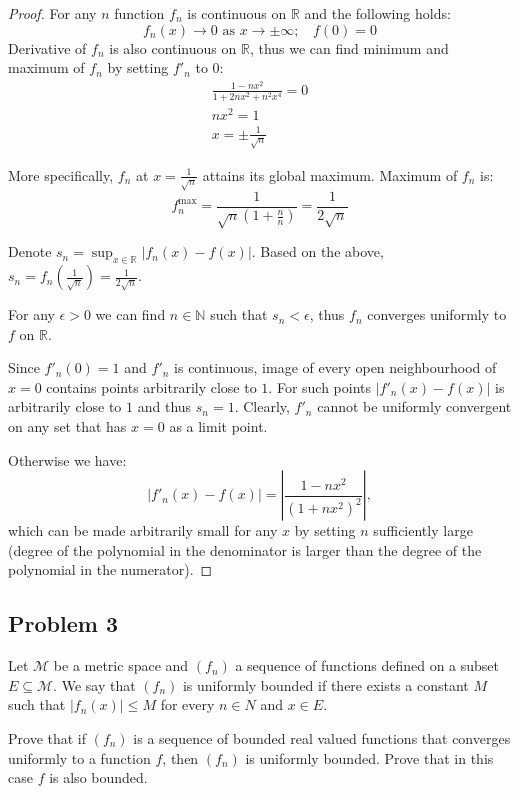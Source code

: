 \documentclass{article}
\begin{document}
\begin{proof}

For any $n$ function $f_n$ is continuous  on $\mathbb{R}$ and the following holds:
\[ f_n(x) \to 0 \text{ as } x \to \pm \infty; \>\>\>\> f(0) = 0 \]
Derivative of $f_n$ is also continuous on $\mathbb{R}$, thus we can find minimum and maximum of $f_n$ by setting $f'_n$ to $0$:
\begin{gather*}
    \frac{1-nx^2}{1+2nx^2+n^2x^4} = 0 \\
    nx^2 = 1 \\
    x = \pm \frac{1}{\sqrt{n}}
\end{gather*}

More specifically, $f_n$ at $x=\frac{1}{\sqrt{n}}$ attains its global maximum.
Maximum of $f_n$ is:
\[ f^{\text{max}}_n = \frac{1}{\sqrt{n}(1+\frac{n}{n})} = \frac{1}{2\sqrt{n}} \]

Denote $s_n = \sup_{x\in\mathbb{R}} |f_n(x)-f(x)|$.
Based on the above, $s_n = f_n \left( \frac{1}{\sqrt{n}} \right) = \frac{1}{2\sqrt{n}}$.

For any $\epsilon>0$ we can find $n\in\mathbb{N}$ such that $s_n < \epsilon$, thus $f_n$ converges uniformly to $f$ on $\mathbb{R}$.

Since $f'_n(0)=1$ and $f'_n$ is continuous, image of every open neighbourhood of $x=0$ contains points arbitrarily close to $1$.
For such points $|f'_n(x)-f(x)|$ is arbitrarily close to $1$ and thus $s_n = 1$.
Clearly, $f'_n$ cannot be uniformly convergent on any set that has $x=0$ as a limit point.

Otherwise we have:
\[ | f'_n(x) - f(x) | = \left| \frac{1-nx^2}{(1+nx^2)^2} \right|, \]
which can be made arbitrarily small for any $x$ by setting $n$ sufficiently large (degree of the polynomial in the denominator is larger than the degree of the polynomial in the numerator).

\end{proof}


\subsection*{Problem 3}

\begin{tcolorbox}
Let $\mathcal{M}$ be a metric space and $(f_n)$ a sequence of functions defined on a subset $E \subseteq \mathcal{M}$.
We say that $(f_n)$ is uniformly bounded if there exists a constant $M$ such that $|f_n (x)| \leq M$ for every $n \in N$ and $x \in E$.

Prove that if $(f_n)$ is a sequence of bounded real valued functions that converges uniformly to a function $f$, then $(f_n)$ is uniformly bounded.
Prove that in this case $f$ is also bounded.
\end{tcolorbox}
\end{document}

